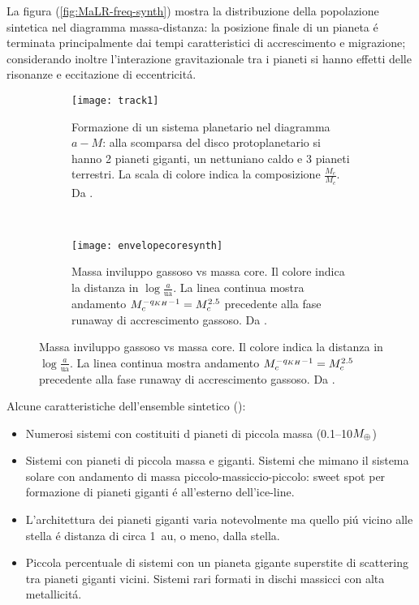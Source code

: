 La figura (\ref{fig:MaLR-freq-synth}) mostra la distribuzione della popolazione sintetica nel diagramma massa-distanza: la posizione finale di un pianeta \'e terminata principalmente dai tempi caratteristici di accrescimento e migrazione; considerando inoltre l'interazione gravitazionale tra i pianeti si hanno effetti delle risonanze e eccitazione di eccentricit\'a.

\begin{figure}[!ht]
\begin{subfigure}[b]{0.47\textwidth}
\centering
\texttt{[image: track1]}
\caption{Formazione di un sistema planetario nel diagramma $a-M$: alla scomparsa del disco protoplanetario si hanno 2 pianeti giganti, un nettuniano caldo e 3 pianeti terrestri. La scala di colore indica la composizione $\frac{M_e}{M_c}$. Da \cite{mordasini2018planetary}.}\label{fig:track1}
\end{subfigure}
~
\begin{subfigure}[b]{0.47\textwidth}
\centering
\texttt{[image: envelopecoresynth]}
\caption{Massa inviluppo gassoso vs massa core. Il colore indica la distanza in $\log{\frac{a}{\si{\astronomicalunit}}}$. La linea continua mostra andamento $M_c^{-q_{KH}-1}=M_c^{2.5}$ precedente alla fase runaway di accrescimento gassoso. Da \cite{mordasini2018planetary}. }\label{fig:envelopecoresynth}
\end{subfigure}
\end{figure}

Alcune caratteristiche dell'ensemble sintetico (\cite{mordasini2018planetary}):
\begin{itemize}
\item Numerosi sistemi con costituiti d pianeti di piccola massa (\numrange{0.1}{10}$M_{\oplus}{}$)
\item Sistemi con pianeti di piccola massa e giganti. Sistemi che mimano il sistema solare con andamento di massa piccolo-massiccio-piccolo: sweet spot per formazione di pianeti giganti \'e all'esterno dell'ice-line.
\item L'architettura dei pianeti giganti varia notevolmente ma quello pi\'u vicino alle stella \'e distanza di circa \SI{1}{\astronomicalunit}, o meno, dalla stella.
\item Piccola percentuale di sistemi con un pianeta gigante superstite di scattering tra pianeti giganti vicini. Sistemi rari formati in dischi massicci con alta metallicit\'a.
\end{itemize}

